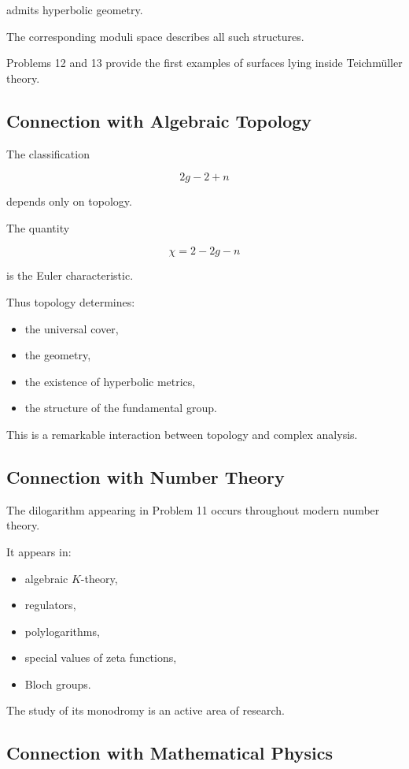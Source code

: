\documentclass[12pt,a4paper]{article}
\theoremstyle{notespace}
\begin{document}
admits hyperbolic geometry.

The corresponding moduli space describes all such structures.

Problems 12 and 13 provide the first examples of surfaces lying inside Teichmüller theory.

\subsection{Connection with Algebraic Topology}

The classification

\[
2g-2+n
\]

depends only on topology.

The quantity

\[
\chi
=
2-2g-n
\]

is the Euler characteristic.

Thus topology determines:

\begin{itemize}
	\item the universal cover,
	\item the geometry,
	\item the existence of hyperbolic metrics,
	\item the structure of the fundamental group.
\end{itemize}

This is a remarkable interaction between topology and complex analysis.

\subsection{Connection with Number Theory}

The dilogarithm appearing in Problem 11 occurs throughout modern number theory.

It appears in:

\begin{itemize}
	\item algebraic \(K\)-theory,
	\item regulators,
	\item polylogarithms,
	\item special values of zeta functions,
	\item Bloch groups.
\end{itemize}

The study of its monodromy is an active area of research.

\subsection{Connection with Mathematical Physics}
\end{document}
